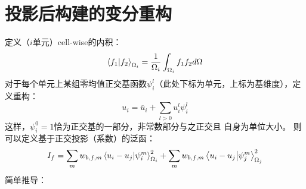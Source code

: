 \documentclass[UTF8,zihao=5]{ctexart} %
\newcommand*{\mean}[1]{\overline{#1}}
\begin{document}
\section{投影后构建的变分重构}

定义（$i$单元）cell-wise的内积：
$$
    \innerproduct{f_1}{f_2}_{\Omega_i}=\frac{1}{\Omega_i}\int_{\Omega_i}{f_1f_2d\Omega}
$$
对于每个单元上某组零均值正交基函数$\psi_i^l$（此处下标为单元，上标为基维度），定义重构：
$$
    u_i=\mean{u}_i + \sum_{l>0}{u_i^l\psi_i^l}
$$
这样，$\psi_i^0=1$恰为正交基的一部分，非常数部分与之正交且
自身为单位大小。
则可以定义基于正交投影（系数）的泛函：
$$
    I_f=
    \sum_{m}
    {
        w_{b,f,m}
        \innerproduct{u_i-u_j}{\psi_i^m}_{\Omega_i}^2
    }
    +
    \sum_{m}
    {
        w_{b,f,m}
        \innerproduct{u_i-u_j}{\psi_j^m}_{\Omega_j}^2
    }
$$
简单推导：
\end{document}
